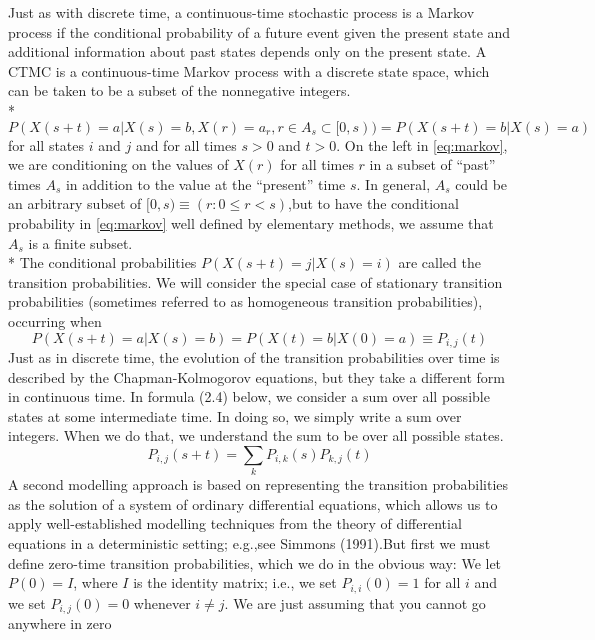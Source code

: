 Just as with discrete time, a continuous-time stochastic process is a Markov process if the conditional probability of a future event given the present state and additional information about past states depends only on the present state. A CTMC is a continuous-time Markov process with a discrete state space, which can be taken to be a subset of the nonnegative integers.\\*
\begin{equation}\label{eq:markov}
P(X(s+t)=a|X(s)=b,X(r)=a_r,r\in A_s\subset[0,s))=P(X(s+t)=b|X(s)=a)
\end{equation}   
for all states $i$ and $j$ and for all times $s > 0$ and $t > 0$. On the left in \ref{eq:markov}, we are conditioning on the values of $X(r)$ for all times $r$ in a subset of “past” times $A_s$ in addition to the value at the “present” time $s$. In general, $A_s$ could be an arbitrary subset of $[0, s) \equiv (r:0\leq r<s)$,but to have the conditional probability in \ref{eq:markov} well defined by elementary methods, we assume that $A_s$ is a finite subset. \\*
The conditional probabilities $P(X(s+t) = j|X(s) = i)$ are called the transition probabilities. We will consider the special case of stationary transition probabilities (sometimes referred to as homogeneous transition probabilities), occurring when
\begin{equation}\label{eq:markov}
P(X(s+t)=a|X(s)=b)=P(X(t)=b|X(0)=a) \equiv P_{i,j}(t)
\end{equation} 
Just as in discrete time, the evolution of the transition probabilities over time is described by the Chapman-Kolmogorov equations, but they take a different form in continuous time. In
formula (2.4) below, we consider a sum over all possible states at some intermediate time. In doing so, we simply write a sum over integers. When we do that, we understand the sum to be over all possible states.
\begin{equation}\label{eq:markov}
P_{i,j}(s+t)= \sum_k P_{i,k}(s)P_{k,j}(t)
\end{equation} 
A second modelling approach is based on representing the transition probabilities as the solution of a system of ordinary differential equations, which allows us to apply well-established modelling techniques from the theory of differential equations in a deterministic setting; e.g.,see Simmons (1991).But first we must define zero-time transition probabilities, which we do in the obvious way: We let $P(0) = I$, where $I$ is the identity matrix; i.e., we set $P_{i,i}(0) = 1$ for all $i$ and we set $P_{i,j} (0) = 0$ whenever $i \neq j$. We are just assuming that you cannot go anywhere in zero
